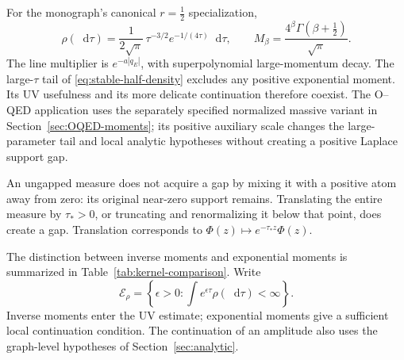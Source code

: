 \documentclass[final,5p,times,twocolumn,numbers,nopreprintline]{elsarticle}
\numberwithin{equation}{section}
\theoremstyle{definition}
\theoremstyle{remark}
\newcommand{\dd}{\mathop{}\!\mathrm d}
\newcommand{\Ph}{\Phi}
\begin{document}
For the monograph's canonical \(r=\tfrac12\) specialization,
\begin{equation}
 \rho(\dd\tau)=\frac1{2\sqrt\pi}\,
     \tau^{-3/2}e^{-1/(4\tau)}\dd\tau,\qquad
 M_\beta=\frac{4^\beta\Gamma(\beta+\tfrac12)}{\sqrt\pi}.
 \label{eq:stable-half-density}
\end{equation}
The line multiplier is \(e^{-a|q_E|}\), with
superpolynomial large-momentum decay. The large-\(\tau\) tail
of \eqref{eq:stable-half-density} excludes any positive
exponential moment. Its UV usefulness and its more delicate
continuation therefore coexist.
The O--QED application uses the separately specified normalized massive
variant in Section~\ref{sec:OQED-moments}; its positive auxiliary scale
changes the large-parameter tail and local analytic hypotheses without
creating a positive Laplace support gap.

An ungapped measure does not acquire a gap by mixing it with a
positive atom away from zero: its original near-zero support
remains. Translating the entire measure by \(\tau_*>0\), or
truncating and renormalizing it below that point, does create a
gap. Translation corresponds to
\(\Ph(z)\mapsto e^{-\tau_*z}\Ph(z)\).

The distinction between inverse moments and exponential moments is
summarized in Table~\ref{tab:kernel-comparison}. Write
\[
 \mathcal E_\rho=\left\{\epsilon>0:
      \int e^{\epsilon\tau}\rho(\dd\tau)<\infty\right\}.
\]
Inverse moments enter the UV estimate; exponential moments give a
sufficient local continuation condition. The continuation of an
amplitude also uses the graph-level hypotheses of
Section~\ref{sec:analytic}.
\end{document}

